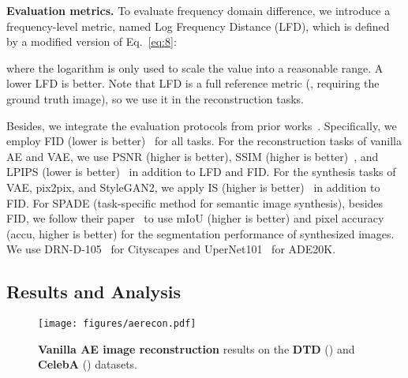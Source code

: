 \documentclass[10pt,twocolumn,letterpaper]{article}
\begin{document}
\vspace{0.05cm}
\noindent
\textbf{Evaluation metrics.}
To evaluate frequency domain difference, we introduce a frequency-level metric, named Log Frequency Distance (LFD), which is defined by a modified version of Eq.~\eqref{eq:8}:

where the logarithm is only used to scale the value into a reasonable range.
A lower LFD is better. Note that LFD is a full reference metric (\ie, requiring the ground truth image), so we use it in the reconstruction tasks.

Besides, we integrate the evaluation protocols from prior works~\cite{nerf,BigGAN,SPADE,tsit}.
Specifically, we employ FID (lower is better)~\cite{TTUR} for all tasks.
For the reconstruction tasks of vanilla AE and VAE, we use PSNR (higher is better), SSIM (higher is better)~\cite{ssim}, and LPIPS (lower is better)~\cite{lpips} in addition to LFD and FID.
For the synthesis tasks of VAE, pix2pix, and StyleGAN2, we apply IS (higher is better)~\cite{is} in addition to FID.
For SPADE (task-specific method for semantic image synthesis), besides FID, we follow their paper~\cite{SPADE} to use mIoU (higher is better) and pixel accuracy (accu, higher is better) for the segmentation performance of synthesized images. We use DRN-D-105~\cite{drn} for Cityscapes and UperNet101~\cite{upernet} for ADE20K.





\subsection{Results and Analysis}
\label{sec:results}


\begin{figure}[t]
	\centering
\texttt{[image: figures/aerecon.pdf]}
\caption{\textbf{Vanilla AE image reconstruction} results on the \textbf{DTD} () and \textbf{CelebA} () datasets.}
	\label{fig:aerecon}
	\vspace{-0.1cm}
\end{figure}
\end{document}
